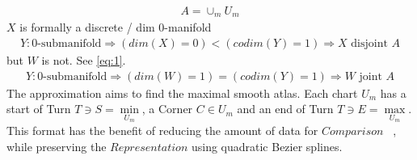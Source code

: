\documentclass{report}
\begin{document}
\begin{align}
A = \cup_{m}U_{m}
\end{align}
$X$ is formally a discrete / dim 0-manifold
\begin{align}
Y: \text{0-submanifold} \Rightarrow (dim(X)=0)<(codim(Y)=1) \Rightarrow X \text{ disjoint } A
\end{align}
but $W$ is not. See \eqref{eq:1}.
\begin{align}
Y: \text{0-submanifold} \Rightarrow (dim(W)=1)=(codim(Y)=1) \Rightarrow W \text{ joint } A
\end{align}
The approximation aims to find the maximal smooth atlas. Each chart $U_{m}$ has a start of Turn $T \ni S = \min \limits _{U_{m}}$, a Corner $C \in U_{m}$ and an end of Turn $T \ni E = \max \limits _{U_{m}}$. This format has the benefit of reducing the amount of data for $Comparison$ ~\cite[Stopeight\_Comparator.tex]{Comparator}, while preserving the $Representation$ using quadratic Bezier splines.\\\\
\end{document}

